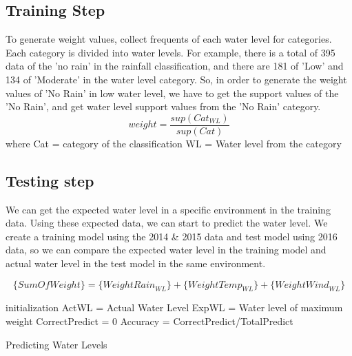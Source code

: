 \documentclass[10pt, conference, compsocconf]{IEEEtran}
\begin{document}
\subsection{Training Step}
To generate weight values, collect frequents of each water level for categories. Each category is divided into water levels. For example, there is a total of 395 data of the 'no rain' in the rainfall classification, and there are 181 of 'Low' and 134 of 'Moderate' in the water level category. So, in order to generate the weight values of 'No Rain' in low water level, we have to get the support values of the 'No Rain', and get water level support values from the 'No Rain' category.
\begin{equation*}
weight = \frac{sup({Cat}_{WL})}{sup({Cat})}
\end{equation*}
where Cat = category of the classification
WL = Water level from the category

\subsection{Testing step}
We can get the expected water level in a specific environment in the training data. Using these expected data, we can start to predict the water level. We create a training model using the 2014 \& 2015 data and test model using 2016 data, so we can compare the expected water level in the training model and actual water level in the test model in the same environment. 

\begin{equation*}
\{SumOfWeight\}=\{{WeightRain}_{WL}\}+\{{WeightTemp}_{WL}\}+\{{WeightWind}_{WL}\}
\end{equation*}

\begin{algorithm}
\SetAlgoLined
{}
    initialization\;
    ActWL = Actual Water Level\;
    ExpWL = Water level of maximum weight\;
    CorrectPredict = 0\;
    Accuracy = CorrectPredict/TotalPredict
 \caption{Predicting Water Levels}
\end{algorithm}
\end{document}
